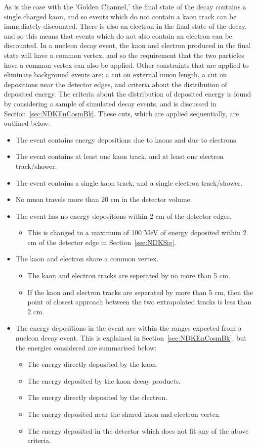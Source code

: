 As is the case with the 'Golden Channel,' the final state of the decay contains a single charged kaon, and so events which do not contain a kaon track can be immediately discounted. There is also an electron in the final state of the decay, and so this means that events which do not also contain an electron can be discounted. In a nucleon decay event, the kaon and electron produced in the final state will have a common vertex, and so the requirement that the two particles have a common vertex can also be applied. Other constraints that are applied to eliminate background events are; a cut on external muon length, a cut on depositions near the detector edges, and criteria about the distribution of deposited energy. The criteria about the distribution of deposited energy is found by considering a sample of simulated decay events, and is discussed in Section~\ref{sec:NDKEnCosmBk}. These cuts, which are applied sequentially, are outlined below:
\begin{itemize}
\item The event contains energy depositions due to kaons and due to electrons.
\item The event contains at least one kaon track, and at least one electron track/shower.
\item The event contains a single kaon track, and a single electron track/shower.
\item No muon travels more than 20 cm in the detector volume.
\item The event has no energy depositions within 2 cm of the detector edges.
  \begin{itemize}
  \item This is changed to a maximum of 100 MeV of energy deposited within 2 cm of the detector edge in Section~\ref{sec:NDKSig}.
  \end{itemize}
\item The kaon and electron share a common vertex.
  \begin{itemize}
  \item The kaon and electron tracks are seperated by no more than 5 cm.
  \item If the kaon and electron tracks are seperated by more than 5 cm, then the point of closest approach between the two extrapolated tracks is less than 2 cm.
  \end{itemize}
\item The energy depositions in the event are within the ranges expected from a nucleon decay event. This is explained in Section~\ref{sec:NDKEnCosmBk}, but the energies considered are summarised below:
  \begin{itemize}
  \item The energy directly deposited by the kaon.
  \item The energy deposited by the kaon decay products.
  \item The energy directly deposited by the electron.
  \item The energy deposited near the shared kaon and electron vertex
  \item The energy deposited in the detector which does not fit any of the above criteria.
  \end{itemize}
\end{itemize}
